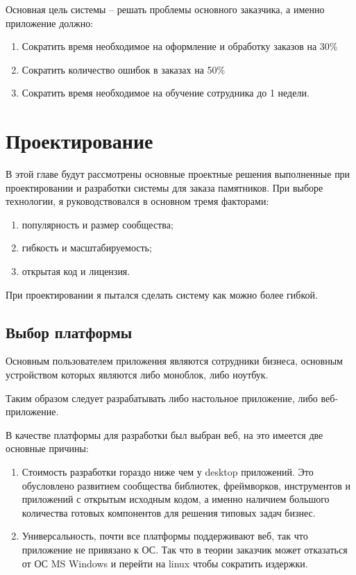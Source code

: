 \documentclass[a4paper,article,14pt]{extarticle}
\begin{document}
Основная цель системы – решать проблемы основного заказчика, а именно приложение должно:

\begin{enumerate}
  \item Сократить время необходимое на оформление и обработку заказов на 30\%
  \item Сократить количество ошибок в заказах на 50\%
  \item Сократить время необходимое на обучение сотрудника до 1 недели.
\end{enumerate}
\pagebreak

\section{Проектирование}

В этой главе будут рассмотрены основные проектные решения выполненные при проектировании и разработки системы для заказа памятников.
При выборе технологии, я руководствовался в основном тремя факторами:

\begin{enumerate}
    \item популярность и размер сообщества;
    \item гибкость и масштабируемость;
    \item открытая код и лицензия.
\end{enumerate}

При проектировании я пытался сделать систему как можно более гибкой.

\subsection{Выбор платформы}

Основным пользователем приложения являются сотрудники бизнеса, 
основным устройством которых являются либо моноблок, либо ноутбук.

Таким образом следует разрабатывать либо настольное приложение, либо веб-приложение.

В качестве платформы для разработки был выбран веб, на это имеется две основные причины:

\begin{enumerate}
    \item Стоимость разработки гораздо ниже чем у desktop приложений. Это обусловлено развитием сообщества библиотек, фреймворков, 
    инструментов и приложений с открытым исходным кодом, 
    а именно наличием большого количества готовых компонентов для решения типовых задач бизнес.
    \item Универсальность, почти все платформы поддерживают веб, так что приложение не привязано к ОС.
    Так что в теории заказчик может отказаться от ОС MS Windows и перейти на linux чтобы сократить издержки.
\end{enumerate}
\pagebreak
\end{document}
